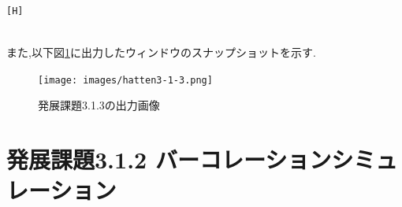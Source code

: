 \documentclass{jarticle}
\begin{document}
\begin{lstlisting}[caption = 発展課題3.1.1,label=code:hatten3-1-1][H]


\end{lstlisting}

また,以下図\ref{fig:hatten3-1-3}に出力したウィンドウのスナップショットを示す.

\begin{figure}[H]
\begin{center}
\texttt{[image: images/hatten3-1-3.png]}
\caption{発展課題3.1.3の出力画像}
\label{fig:hatten3-1-3}
\end{center}
\end{figure}


\section{発展課題3.1.2 バーコレーションシミュレーション}
\end{document}
